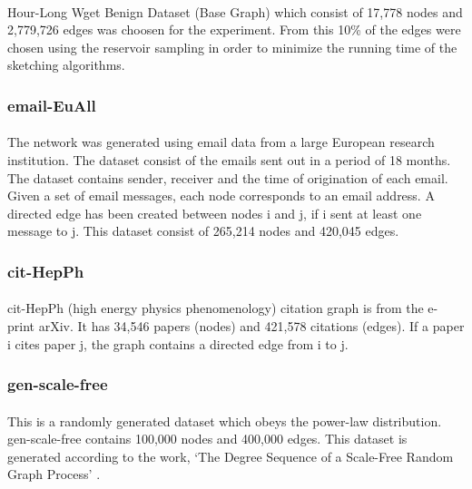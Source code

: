 \paragraph{}
Hour-Long Wget Benign Dataset (Base Graph) which consist of 17,778 nodes and 2,779,726 edges was choosen for the experiment. From this 10\% of the edges were chosen using the reservoir sampling in order to minimize the running time of the sketching algorithms.

\subsubsection{email-EuAll\cite{leskovec_graph_2007}}

\paragraph{}
The network was generated using email data from a large European research institution. The dataset consist of the emails sent out in a period of 18 months. The dataset contains sender, receiver and the time of origination of each email. Given a set of email messages, each node corresponds to an email address. A directed edge has been created between nodes i and j, if i sent at least one message to j. This dataset consist of 265,214 nodes and 420,045 edges\cite{noauthor_snap_nodate_email}.

\subsubsection{cit-HepPh\cite{leskovec_graphs_2005, gehrke_overview_2003}}

\paragraph{}
cit-HepPh (high energy physics phenomenology) citation graph is from the e-print arXiv. It has 34,546 papers (nodes) and 421,578 citations (edges). If a paper i cites paper j, the graph contains a directed edge from i to j\cite{noauthor_snap_nodate_hep}.

\subsubsection{gen-scale-free}

\paragraph{}
This is a randomly generated dataset which obeys the power-law distribution. gen-scale-free contains 100,000 nodes and 400,000 edges. This dataset is generated according to the work, ‘The Degree Sequence of a Scale-Free Random Graph Process’
\cite{bollobas_degree_2001}.

